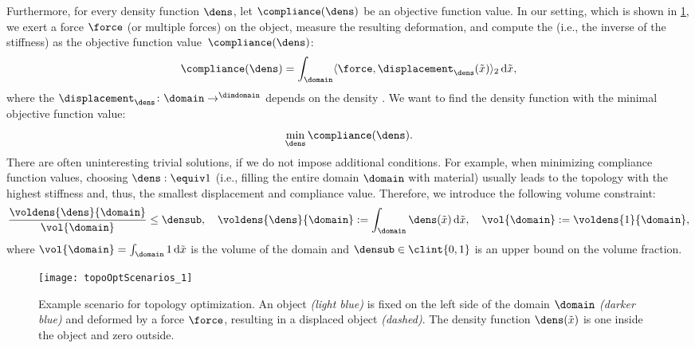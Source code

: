 Furthermore, for every density function $\dens$,
let $\compliance(\dens)$ be an objective function value.
In our setting, which is shown in \cref{fig:topoOptExampleScenario},
we exert a force $\force$ (or multiple forces) on the object,
measure the resulting deformation, and
compute the  (i.e., the inverse of the stiffness) as
the objective function value~$\compliance(\dens)$:
\begin{equation}
  \compliance(\dens)
  = \int_{\domain} \innerprod[2]{\force}{\displacement_{\dens}(\tilde{\*x})}
  \diff\tilde{\*x},
\end{equation}
where the 
$\displacement_{\dens}\colon \domain \to \real^{\dimdomain}$
depends on the density \cite{Huebner14Mehrdimensionale}.
We want to find the density function
with the minimal objective function value:
\begin{equation}
  \label{eq:topoOptProblemContinuous}
  \min_{\dens} \compliance(\dens).
\end{equation}
There are often uninteresting trivial solutions,
if we do not impose additional conditions.
For example, when minimizing compliance function values,
choosing $\dens :\equiv 1$
(i.e., filling the entire domain $\domain$ with material)
usually leads to the topology with the
highest stiffness and, thus, the smallest displacement and compliance value.
Therefore, we introduce the following volume constraint:
\begin{equation}
  \frac{\voldens{\dens}{\domain}}{\vol{\domain}} \le \densub,\quad
  \voldens{\dens}{\domain}
  := \int_{\domain} \dens(\tilde{\*x}) \diff\tilde{\*x},\quad
  \vol{\domain}
  := \voldens{1}{\domain},
\end{equation}
where $\vol{\domain} = \int_{\domain} 1 \diff\tilde{\*x}$
is the volume of the domain and
$\densub \in \clint{0, 1}$ is an upper bound on the volume fraction.

\begin{SCfigure}
  \texttt{[image: topoOptScenarios\_1]}%
  \caption[%
    Example scenario for topology optimization%
  ]{%
    Example scenario for topology optimization.
    An object \emph{\textcolor{hellblau}{(light blue)}}
    is fixed on the left side
    of the domain $\domain$
    \emph{\textcolor{mittelblau!50}{(darker blue)}}
    and deformed by a force $\force$, resulting in a displaced object
    \emph{(dashed)}.
    The density function $\dens(\tilde{\*x})$ is one inside the object
    and zero outside.%
  }%
  \label{fig:topoOptExampleScenario}%
\end{SCfigure}



